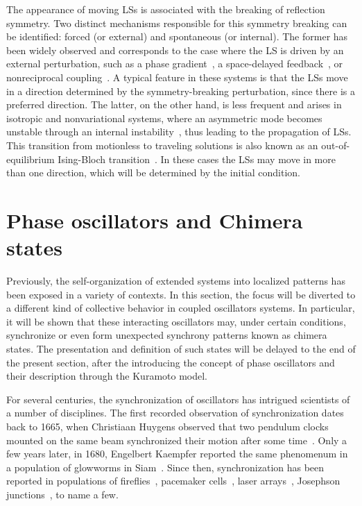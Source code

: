 The appearance of moving LSs is associated with the breaking of reflection symmetry. Two
distinct mechanisms responsible for this symmetry breaking can be identified: forced
(or external) and spontaneous (or internal). The former has been widely observed and 
corresponds to the case
where the LS is driven by an external perturbation, such as a phase gradient~\cite{turaev2008chaotic}, 
a space-delayed feedback~\cite{haudin2011vortex}, or nonreciprocal coupling~\cite{pinto2021nonreciprocal}. A typical feature in these systems is that the LSs
move in a direction determined by the symmetry-breaking perturbation, since there
is a preferred direction.
The latter, on the other hand, is less frequent and arises in isotropic and
nonvariational systems, where an asymmetric mode becomes unstable through an internal
instability~\cite{michaelis2001universal}, thus leading to the propagation of LSs. This transition from motionless
to traveling solutions is also known as an out-of-equilibrium Ising-Bloch 
transition~\cite{coullet1990breaking,gilli1994ising,haim1996breathing,michaelis2001universal,clerc2010localized}.
In these cases the LSs may move 
in more than one direction, which will be determined by the initial condition. 


\section{Phase oscillators and Chimera states}

Previously, the self-organization of extended systems into localized patterns has been exposed
in a variety of contexts. In this section, the focus will be diverted to a different kind of
collective behavior in coupled oscillators systems. In particular, it will be shown
that these interacting oscillators may, under certain conditions, synchronize or even
form unexpected synchrony patterns known as chimera states. The presentation and
definition of such states will be delayed to the end of the present section, after
the introducing the concept of phase oscillators and their description
through the Kuramoto model.

For several centuries, the synchronization of oscillators has intrigued scientists
of a number of disciplines. The first recorded observation of synchronization
dates back to 1665, when Christiaan Huygens observed that two pendulum clocks
mounted on the same beam synchronized their motion after some time~\cite{huygens1673horologium}.
Only a few years later, in 1680, Engelbert Kaempfer reported the same phenomenum
in a population of glowworms in Siam~\cite{kaempfer1727history}. Since then, synchronization has been
reported in populations of fireflies~\cite{buck1988synchronous}, pacemaker cells~\cite{michaels1987mechanisms}, 
laser arrays~\cite{vladimirov2003synchronization}, Josephson junctions~\cite{wiesenfeld1998frequency}, 
to name a few. 

